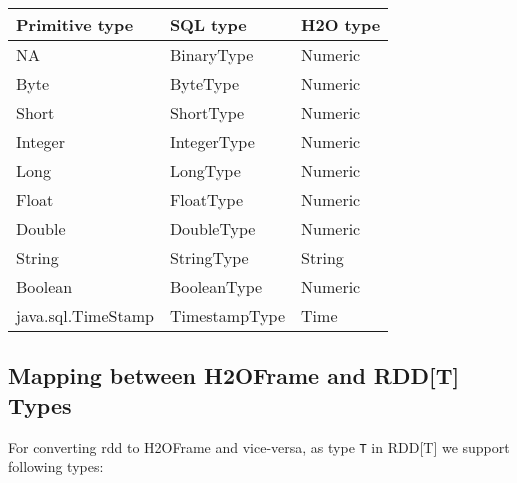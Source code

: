 \documentclass{standalone}
\begin{document}
    \begin{table}[!ht]
        \centering
        \begin{tabular}{l l l}
            \toprule
            Primitive type     & SQL type   & H2O type \\
            \midrule
            NA                 & BinaryType    & Numeric  \\
            Byte               & ByteType      & Numeric  \\
            Short              & ShortType     & Numeric  \\
            Integer            & IntegerType   & Numeric  \\
            Long               & LongType      & Numeric  \\
            Float              & FloatType     & Numeric  \\
            Double             & DoubleType    & Numeric  \\
            String             & StringType    & String   \\
            Boolean            & BooleanType   & Numeric  \\
            java.sql.TimeStamp & TimestampType & Time     \\
            \bottomrule
        \end{tabular}
    \end{table}

    \newpage
    \subsection{Mapping between H2OFrame and RDD[T] Types}

    For converting rdd to H2OFrame and vice-versa, as type \texttt{T} in RDD[T] we support following types:
\end{document}
